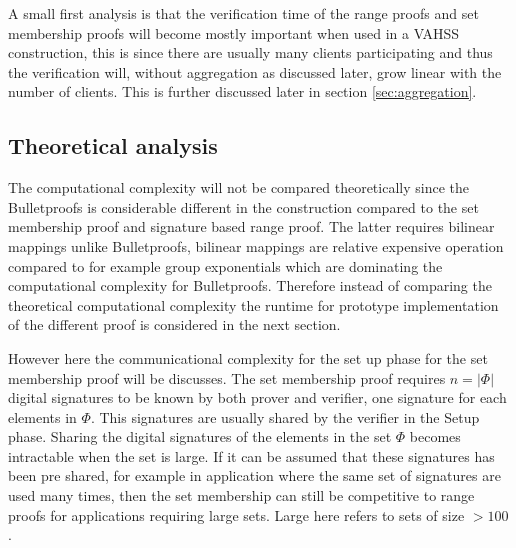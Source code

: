 
A small first analysis is that the verification time of the range proofs and set membership proofs will become mostly important when used in a VAHSS construction, this is since there are usually many clients participating and thus the verification will, without aggregation as discussed later, grow linear with the number of clients. This  is further discussed later in section \ref{sec:aggregation}.


\subsection{Theoretical analysis}
The computational complexity will not be compared theoretically since the Bulletproofs is considerable different in the construction compared to the set membership proof and signature based range proof. The latter requires bilinear mappings unlike Bulletproofs, bilinear mappings are relative expensive operation compared to for example group exponentials which are dominating  the computational complexity for Bulletproofs. Therefore instead of comparing the theoretical computational complexity the runtime for prototype implementation of the different proof is considered in the next section. 

However here the communicational complexity for the set up phase for the set membership proof will be discusses. The set membership proof requires $n=|\Phi|$ digital signatures to be known by both prover and verifier, one signature for each elements in $\Phi$. This signatures are usually shared by the verifier in the Setup phase. Sharing the digital signatures of the elements in the set $\Phi$ becomes intractable when the set is large.  If it can be assumed that these signatures has been pre shared, for example in application where the same set of signatures are used many times, then the set membership can still be competitive to range proofs for applications requiring large sets. Large here refers to sets of size $>100$. 

